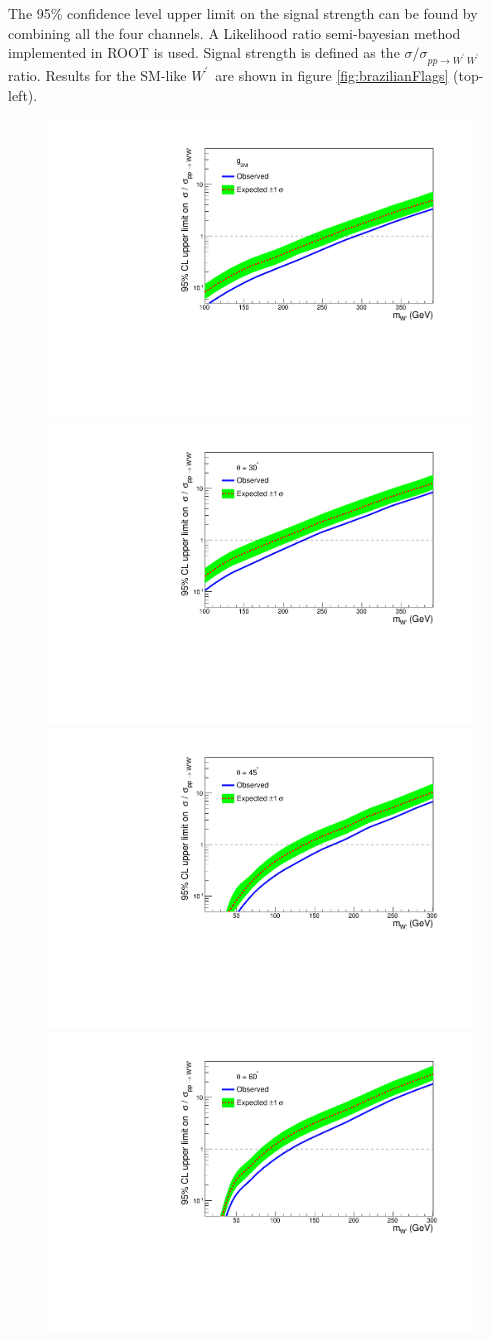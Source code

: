 \documentclass[preprint,showpacs,preprintnumbers]{revtex4}
\newcommand{\wprime}{\ensuremath{W^\prime}~}
\begin{document}
The 95\% confidence level upper limit on the signal strength can be found by combining all the four channels. A Likelihood ratio semi-bayesian method implemented in ROOT \cite{Brun:1997pa} is used. Signal strength is defined as the $\sigma /\sigma_{pp \to \wprime\wprime}$ratio. Results for the SM-like \wprime are shown in figure  \ref{fig:brazilianFlags} (top-left). 
\begin{figure}[!htb]
	\centering
	\includegraphics*[width=.45\textwidth]{mix0b.pdf}
	\vspace{3mm}	
	\includegraphics*[width=.45\textwidth]{mix30b.pdf}
	\hspace{3mm}
	\includegraphics*[width=.45\textwidth]{mix45b.pdf}
	\vspace{3mm}	
	\includegraphics*[width=.45\textwidth]{mix60b.pdf}
	\hspace{3mm}

\end{figure}
\end{document}
